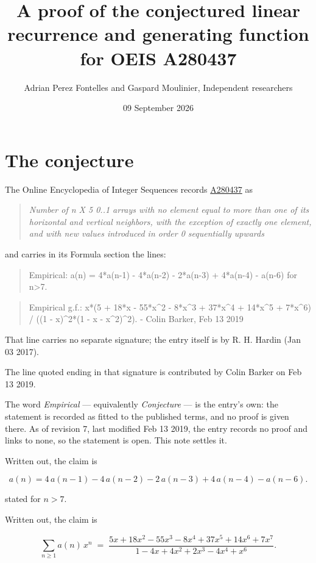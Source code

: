 \documentclass[11pt]{article}
\title{A proof of the conjectured linear recurrence and generating function for OEIS A280437}
\author{Adrian Perez Fontelles and Gaspard Moulinier, Independent researchers}
\date{09 September 2026}
\theoremstyle{definition}
\begin{document}
\maketitle
\section{The conjecture}

The Online Encyclopedia of Integer Sequences records \href{https://oeis.org/A280437}{A280437} as

\begin{quote}\itshape Number of n X 5 0..1 arrays with no element equal to more than one of its horizontal and vertical neighbors, with the exception of exactly one element, and with new values introduced in order 0 sequentially upwards\end{quote}

and carries in its Formula section the lines:

\begin{quote}\ttfamily Empirical: a(n) = 4*a(n-1) - 4*a(n-2) - 2*a(n-3) + 4*a(n-4) - a(n-6) for n>7.\end{quote}

\begin{quote}\ttfamily Empirical g.f.: x*(5 + 18*x - 55*x\textasciicircum{}2 - 8*x\textasciicircum{}3 + 37*x\textasciicircum{}4 + 14*x\textasciicircum{}5 + 7*x\textasciicircum{}6) / ((1 - x)\textasciicircum{}2*(1 - x - x\textasciicircum{}2)\textasciicircum{}2). - Colin Barker, Feb 13 2019\end{quote}

That line carries no separate signature; the entry itself is by R. H. Hardin (Jan 03 2017).

The line quoted ending in that signature is contributed by Colin Barker on Feb 13 2019.

The word {\itshape Empirical} --- equivalently {\itshape Conjecture} --- is the entry's own: the statement is recorded as fitted to the published terms, and no proof is given there. As of revision 7, last modified Feb 13 2019, the entry records no proof and links to none, so the statement is open. This note settles it.

Written out, the claim is

\[a(n) = 4\,a(n-1) - 4\,a(n-2) - 2\,a(n-3) + 4\,a(n-4) - a(n-6).\]

stated for $n > 7$.

Written out, the claim is

\[\sum_{n \ge 1} a(n)\,x^n \;=\; \frac{5x + 18x^{2} - 55x^{3} - 8x^{4} + 37x^{5} + 14x^{6} + 7x^{7}}{1 - 4x + 4x^{2} + 2x^{3} - 4x^{4} + x^{6}}.\]
\end{document}
